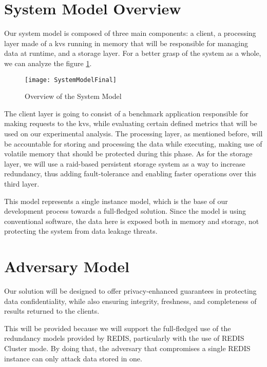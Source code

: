 \section{System Model Overview} %
\label{sec:dealing_with_bibliogrpahy}

Our system model is composed of three main components: a client, a processing layer made of a \gls{kvs} running in memory that will be responsible for managing data at runtime, and a storage layer. For a better grasp of the system as a whole, we can analyze the figure \ref{fig:systemModel}.

\begin{figure}[htbp]
	\centering
	{\texttt{[image: SystemModelFinal]}}
	\caption{Overview of the System Model}
	\label{fig:systemModel}
\end{figure}

The client layer is going to consist of a benchmark application responsible for making requests to the \gls{kvs}, while evaluating certain defined metrics that will be used on our experimental analysis. The processing layer, as mentioned before, will be accountable for storing and processing the data while executing, making use of volatile memory that should be protected during this phase. As for the storage layer, we will use a \gls{raid}-based persistent storage system as a way to increase redundancy, thus adding fault-tolerance and enabling faster operations over this third layer.

This model represents a single instance model, which is the base of  our development process towards a full-fledged solution. Since the model is using conventional software, the data here is exposed both in memory and storage, not protecting the system from data leakage threats.





\section{Adversary Model} %
\label{sec:inserting_tables}


Our solution will be designed to offer privacy-enhanced guarantees in protecting data confidentiality, while also ensuring integrity, freshness, and completeness of results returned to the clients. 

This will be provided because we will support the full-fledged use of the redundancy models provided by REDIS, particularly with the use of REDIS Cluster mode. By doing that, the adversary that compromises a single REDIS instance can only attack data stored in one. 

